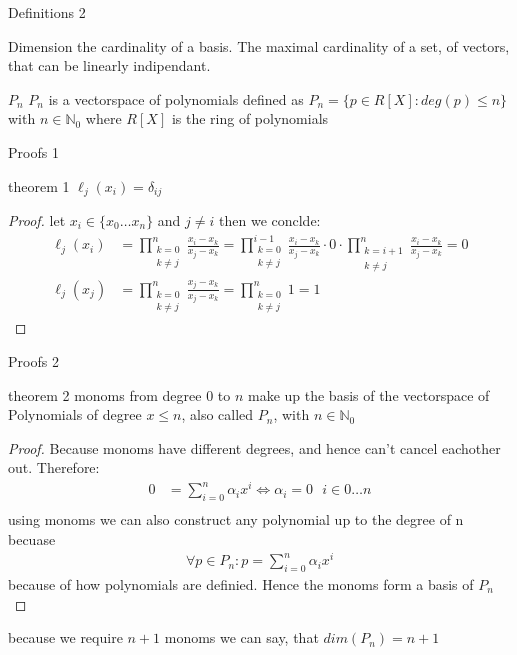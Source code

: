 \documentclass[8pt]{beamer}
\begin{document}
\begin{frame}{Definitions 2}
	\begin{block}{Dimension}
		the cardinality of a basis. The maximal cardinality of a set, of vectors, that can be linearly indipendant. 
	\end{block}
	\begin{block}{$P_n$}
		$P_n$ is a vectorspace of polynomials defined as $P_n = \{p \in R[X]: deg(p)\leq n \}$ with $n \in \mathbb{N}_0$ where $ R[X]$ is the ring of polynomials
	\end{block}
\end{frame}
\begin{frame}{Proofs 1}
	\begin{block}{theorem 1}
		$\ell_j(x_i) = \delta_{ij}$
	\end{block}
	\begin{proof}
		let $x_i \in \{x_0\ldots x_n \}$ and $j \neq i $ then we conclde: 
		\begin{align*}
			\ell_j(x_i) &= \prod_{\substack{k= 0 \\ k \neq j }}^{n}\frac{x_i - x_k}{x_j - x_k} = \prod_{\substack{k= 0 \\ k \neq j}}^{i-1}\frac{x_i - x_k}{x_j - x_k} \cdot 0 \cdot \prod_{\substack{k= i+1 \\k \neq j}}^{n}\frac{x_i - x_k}{x_j - x_k} = 0 \\
			\ell_j(x_j) &= \prod_{\substack{k= 0 \\ k \neq j }}^{n}\frac{x_j - x_k}{x_j - x_k} =  \prod_{\substack{k= 0 \\ k \neq j }}^{n} 1 = 1
		\end{align*}
	\end{proof}
\end{frame}
\begin{frame}{Proofs 2}
\begin{block}{theorem 2}
	monoms from degree $0$ to $n$ make up the basis of the vectorspace of Polynomials of degree $x \leq n$, also called $P_n$, with $n \in \mathbb{N}_0$
\end{block}
	\begin{proof}
	Because monoms have different degrees, and hence can't cancel eachother out. Therefore: 
	\begin{align*}
		0 &= \sum_{i =0}^{n}\alpha_i x^i \Leftrightarrow \alpha_i = 0\text{   } i\in 0\ldots n \\
	\end{align*}
	using monoms we can also construct any polynomial up to the degree of n becuase
	\begin{align*}
		\forall p \in P_n : p = \sum_{i =0}^{n}\alpha_i x^i 
	\end{align*}
	because of how polynomials are definied. Hence the monoms form a basis of $P_n$
	\end{proof}
	because we require $n+1$ monoms we can say, that $dim(P_n) = n+1$
\end{frame}
\end{document}
